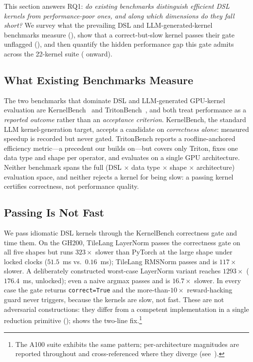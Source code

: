 This section answers RQ1: \emph{do existing benchmarks distinguish efficient DSL kernels from performance-poor ones, and along which dimensions do they fall short?}
We survey what the prevailing DSL and LLM-generated-kernel benchmarks measure (), show that a correct-but-slow kernel passes their gate unflagged (), and then quantify the hidden performance gap this gate admits across the 22-kernel suite ( onward).

\subsection{What Existing Benchmarks Measure}
\label{sec:eval:survey}

The two benchmarks that dominate DSL and LLM-generated GPU-kernel evaluation are KernelBench~\cite{kernelbench} and TritonBench~\cite{li2025tritonbench}, and both treat performance as a \emph{reported outcome} rather than an \emph{acceptance criterion}.
KernelBench, the standard LLM kernel-generation target, accepts a candidate on \emph{correctness alone}: measured speedup is recorded but never gated.
TritonBench reports a roofline-anchored efficiency metric---a precedent our  builds on---but covers only Triton, fixes one data type and shape per operator, and evaluates on a single GPU architecture.
Neither benchmark spans the full (DSL $\times$ data type $\times$ shape $\times$ architecture) evaluation space, and neither rejects a kernel for being slow: a passing kernel certifies correctness, not performance quality.

\subsection{Passing Is Not Fast}
\label{sec:eval:passesslow}

We pass idiomatic DSL kernels through the KernelBench correctness gate and time them.
On the GH200, TileLang LayerNorm passes the correctness gate on all five shapes but runs $323\times$ slower than PyTorch at the large shape under locked clocks ($51.5$~ms vs.\ $0.16$~ms); TileLang RMSNorm passes and is $117\times$ slower. A deliberately constructed worst-case LayerNorm variant reaches $1293\times$ ($176.4$~ms, unlocked); even a naive argmax passes and is $16.7\times$ slower.
In every case the gate returns \texttt{correct=True} and the more-than-$10\times$ reward-hacking guard never triggers, because the kernels are slow, not fast.
These are not adversarial constructions: they differ from a competent implementation in a single reduction primitive ();  shows the two-line fix.\footnote{The A100 suite exhibits the same pattern; per-architecture magnitudes are reported throughout and cross-referenced where they diverge (see~).}

